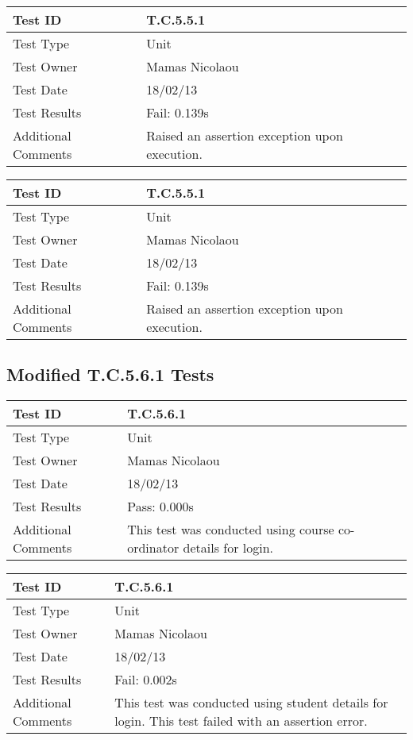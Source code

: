 \documentclass{l3deliverable}
\begin{document}
\begin{tabular}{|p{2cm}|p{12cm}|}
\hline
Test ID & T.C.5.5.1\\
\hline
Test Type & Unit\\
\hline
Test Owner  & Mamas Nicolaou\\
\hline
Test Date & 18/02/13\\
\hline
Test Results & Fail: 0.139s\\
\hline
Additional Comments & Raised an assertion exception upon execution.\\
\hline
\end{tabular}

\vspace{4 mm}

\begin{tabular}{|p{2cm}|p{12cm}|}
\hline
Test ID & T.C.5.5.1\\
\hline
Test Type & Unit\\
\hline
Test Owner  & Mamas Nicolaou\\
\hline
Test Date & 18/02/13\\
\hline
Test Results & Fail: 0.139s\\
\hline
Additional Comments & Raised an assertion exception upon execution.\\
\hline
\end{tabular}

\subsection{Modified T.C.5.6.1 Tests}

\begin{tabular}{|p{2cm}|p{12cm}|}
\hline
Test ID & T.C.5.6.1\\
\hline
Test Type & Unit\\
\hline
Test Owner  & Mamas Nicolaou\\
\hline
Test Date & 18/02/13\\
\hline
Test Results & Pass: 0.000s\\
\hline
Additional Comments & This test was conducted using course co-ordinator details for login.\\
\hline
\end{tabular}

\vspace{4 mm}

\begin{tabular}{|p{2cm}|p{12cm}|}
\hline
Test ID & T.C.5.6.1\\
\hline
Test Type & Unit\\
\hline
Test Owner  & Mamas Nicolaou\\
\hline
Test Date & 18/02/13\\
\hline
Test Results & Fail: 0.002s\\
\hline
Additional Comments & This test was conducted using student details for login. This test failed with an assertion error.\\
\hline
\end{tabular}
\end{document}
